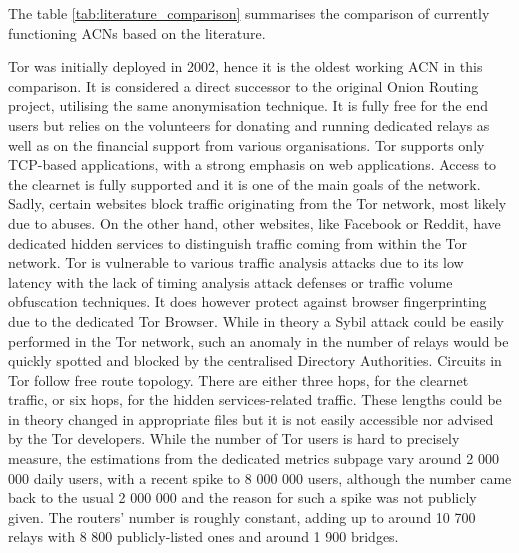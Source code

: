 The table \ref{tab:literature_comparison} summarises the comparison of currently functioning ACNs based on the literature.

Tor was initially deployed in 2002, hence it is the oldest working ACN in this comparison. It is considered a direct successor to the original Onion Routing project, utilising the same anonymisation technique. It is fully free for the end users but relies on the volunteers for donating and running dedicated relays as well as on the financial support from various organisations. Tor supports only TCP-based applications, with a strong emphasis on web applications. Access to the clearnet is fully supported and it is one of the main goals of the network. Sadly, certain websites block traffic originating from the Tor network, most likely due to abuses. On the other hand, other websites, like Facebook or Reddit, have dedicated hidden services to distinguish traffic coming from within the Tor network. Tor is vulnerable to various traffic analysis attacks due to its low latency with the lack of timing analysis attack defenses or traffic volume obfuscation techniques. It does however protect against browser fingerprinting due to the dedicated Tor Browser. While in theory a Sybil attack could be easily performed in the Tor network, such an anomaly in the number of relays would be quickly spotted and blocked by the centralised Directory Authorities. Circuits in Tor follow free route topology. There are either three hops, for the clearnet traffic, or six hops, for the hidden services-related traffic. These lengths could be in theory changed in appropriate files but it is not easily accessible nor advised by the Tor developers. While the number of Tor users is hard to precisely measure, the estimations from the dedicated metrics subpage vary around 2 000 000 daily users, with a recent spike to 8 000 000 users, although the number came back to the usual 2 000 000 and the reason for such a spike was not publicly given. The routers’ number is roughly constant, adding up to around 10 700 relays with 8 800 publicly-listed ones and around 1 900 bridges.

